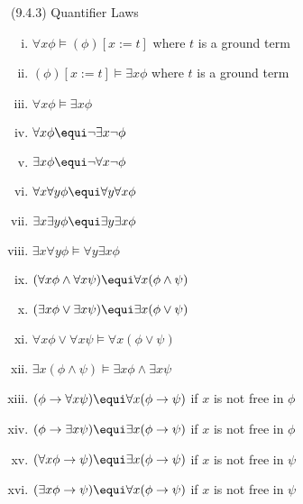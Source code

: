 \begin{frame}{(9.4.3) Quantifier Laws}

		
		\begin{enumerate}[(i)]
		
		\item $\forall x\phi\vDash(\phi)[x:=t]$  where $t$ is a ground term
%		
		\item $(\phi)[x:=t]\vDash\exists x\phi$ where $t$ is a ground term

		\item $\forall x\phi\vDash\exists x\phi$
		
		\item $\forall x\phi\equi \neg \exists x\neg\phi$
	
			\item $\exists x\phi\equi \neg \forall x\neg \phi$
		
			\item $\forall x\forall y\phi\equi \forall y\forall x\phi$

	\item $\exists x\exists y\phi\equi \exists y\exists x\phi$

	\item $\exists x\forall y\phi\vDash \forall y \exists x\phi$
		
	\item $(\forall x\phi\land \forall x\psi)\equi \forall x(\phi\land \psi)$

	\item $(\exists x\phi\lor \exists x\psi)\equi \exists x(\phi\lor \psi)$

	\item $\forall x\phi\lor \forall x\psi\vDash \forall x(\phi\lor \psi)$  

	\item  $\exists x(\phi\land \psi)\vDash \exists x\phi\land \exists x \psi$  
	\item $(\phi\to \forall x\psi)\equi \forall x(\phi\to \psi)$ if $x$ is not free in $\phi$

	\item $(\phi\to \exists x\psi)\equi \exists x(\phi\to \psi)$ if $x$ is not free in $\phi$

	\item $(\forall x\phi\to \psi)\equi \exists x(\phi\to \psi)$ if $x$ is not free in $\psi$

	\item $(\exists x\phi\to \psi)\equi \forall x(\phi\to \psi)$ if $x$ is not free in $\psi$

		\end{enumerate}

\end{frame}

